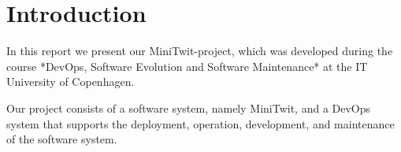 \section*{Introduction}

In this report we present our MiniTwit-project, which was developed during the course *DevOps, Software Evolution and Software Maintenance* at the IT University of Copenhagen.

Our project consists of a software system, namely MiniTwit, and a DevOps system that supports the deployment, operation, development, and maintenance of the software system.

